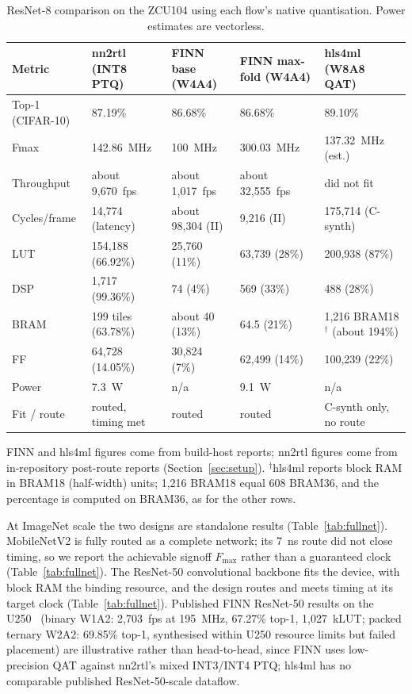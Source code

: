 \begin{table}[t]
\centering
\caption{ResNet-8 comparison on the ZCU104 using each flow's native quantisation. Power estimates are vectorless.}
\label{tab:resnet8}
\footnotesize
\begin{tabular}{@{}p{}p{}p{}p{}p{}@{}}
\toprule
Metric & nn2rtl (INT8 PTQ) & FINN base (W4A4) & FINN max-fold (W4A4) & hls4ml (W8A8 QAT) \\
\midrule
Top-1 (CIFAR-10) & 87.19\% & 86.68\% & 86.68\% & 89.10\% \\
Fmax & 142.86~MHz & 100~MHz & 300.03~MHz & 137.32~MHz (est.) \\
Throughput & about 9,670~fps & about 1,017~fps & about 32,555~fps & did not fit \\
Cycles/frame & 14,774 (latency) & about 98,304 (II) & 9,216 (II) & 175,714 (C-synth) \\
LUT & 154,188 (66.92\%) & 25,760 (11\%) & 63,739 (28\%) & 200,938 (87\%) \\
DSP & 1,717 (99.36\%) & 74 (4\%) & 569 (33\%) & 488 (28\%) \\
BRAM & 199 tiles (63.78\%) & about 40 (13\%) & 64.5 (21\%) & 1,216 BRAM18$^{\dagger}$ (about 194\%) \\
FF & 64,728 (14.05\%) & 30,824 (7\%) & 62,499 (14\%) & 100,239 (22\%) \\
Power & 7.3~W & n/a & 9.1~W & n/a \\
Fit / route & routed, timing met & routed & routed & C-synth only, no route \\
\bottomrule
\end{tabular}
\vspace{2pt}
\begin{minipage}{0.97\textwidth}
\footnotesize FINN and hls4ml figures come from build-host reports; nn2rtl figures come from in-repository post-route reports (Section~\ref{sec:setup}). $^{\dagger}$hls4ml reports block RAM in BRAM18 (half-width) units; 1,216 BRAM18 equal 608 BRAM36, and the percentage is computed on BRAM36, as for the other rows.
\end{minipage}
\end{table}

At ImageNet scale the two designs are standalone results (Table~\ref{tab:fullnet}). MobileNetV2 is fully routed as a complete network; its 7~ns route did not close timing, so we report the achievable signoff $F_{\max}$ rather than a guaranteed clock (Table~\ref{tab:fullnet}). The ResNet-50 convolutional backbone fits the device, with block RAM the binding resource, and the design routes and meets timing at its target clock (Table~\ref{tab:fullnet}). Published FINN ResNet-50 results on the U250~\cite{petrica2020} (binary W1A2: 2,703~fps at 195~MHz, 67.27\% top-1, 1,027~kLUT; packed ternary W2A2: 69.85\% top-1, synthesised within U250 resource limits but failed placement) are illustrative rather than head-to-head, since FINN uses low-precision QAT against nn2rtl's mixed INT3/INT4 PTQ; hls4ml has no comparable published ResNet-50-scale dataflow.

